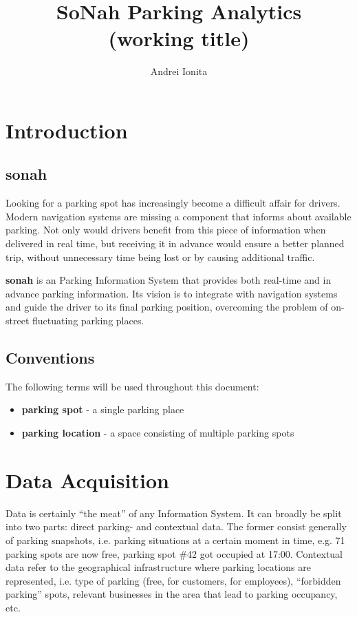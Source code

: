 \documentclass{article}
\begin{document}
\title{SoNah Parking Analytics \\ \large (working title)}
\author{Andrei Ionita}

\maketitle

\section{Introduction}
\subsection{sonah}
Looking for a parking spot has increasingly become a difficult affair for drivers. Modern navigation systems are missing a component that informs about available parking. Not only would drivers benefit from this piece of information when delivered in real time, but receiving it in advance would ensure a better planned trip, without unnecessary time being lost or by causing additional traffic.

\textbf{sonah} is an Parking Information System that provides both real-time and in advance parking information. Its vision is to integrate with navigation systems and guide the driver to its final parking position, overcoming the problem of on-street fluctuating parking places.

\subsection{Conventions}
The following terms will be used throughout this document:
\begin{itemize}
\item \textbf{parking spot} - a single parking place
\item \textbf{parking location} - a space consisting of multiple parking spots
\end{itemize}

\section{Data Acquisition}
Data is certainly ``the meat'' of any Information System. It can broadly be split into two parts: direct parking- and contextual data. The former consist generally of parking snapshots, i.e. parking situations at a certain moment in time, e.g. 71 parking spots are now free, parking spot \#42 got occupied at 17:00. Contextual data refer to the geographical infrastructure where parking locations are represented, i.e. type of parking (free, for customers, for employees), ``forbidden parking'' spots, relevant businesses in the area that lead to parking occupancy, etc.
\end{document}
